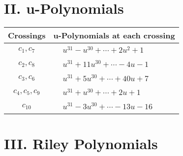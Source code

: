 \documentclass[1p]{elsarticle_modified}
\theoremstyle{definition}
\begin{document}
\newpage\renewcommand{\arraystretch}{1}
\centering \section*{ II. u-Polynomials}
\begin{tabular}{m{50pt}|m{274pt}}
Crossings & \hspace{64pt}u-Polynomials at each crossing \\
\hline $$\begin{aligned}c_{1},c_{7}\end{aligned}$$&$\begin{aligned}
&u^{31}- u^{30}+\cdots+2 u^2+1
\end{aligned}$\\
\hline $$\begin{aligned}c_{2},c_{8}\end{aligned}$$&$\begin{aligned}
&u^{31}+11 u^{30}+\cdots-4 u-1
\end{aligned}$\\
\hline $$\begin{aligned}c_{3},c_{6}\end{aligned}$$&$\begin{aligned}
&u^{31}+5 u^{30}+\cdots+40 u+7
\end{aligned}$\\
\hline $$\begin{aligned}c_{4},c_{5},c_{9}\end{aligned}$$&$\begin{aligned}
&u^{31}+u^{30}+\cdots+2 u+1
\end{aligned}$\\
\hline $$\begin{aligned}c_{10}\end{aligned}$$&$\begin{aligned}
&u^{31}-3 u^{30}+\cdots-13 u-16
\end{aligned}$\\
\hline
\end{tabular}\newpage\renewcommand{\arraystretch}{1}
\centering \section*{ III. Riley Polynomials}
\end{document}
